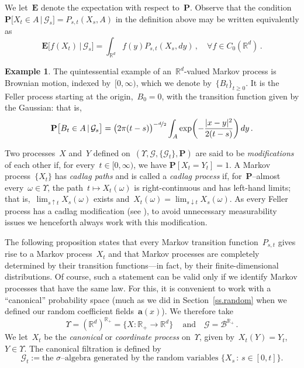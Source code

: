 \documentclass[11pt,twoside]{article} %
\numberwithin{equation}{section}
\theoremstyle{definition}
\newtheorem{example}[theorem]{Example}
\newcommand*{\R}{\ensuremath{\mathbb{R}}}
\newcommand*{\Rd}{\ensuremath{\mathbb{R}^d}}
\renewcommand{\a}{\mathbf{a}}
\begin{document}
We let~$\mathbf{E}$ denote the expectation with respect to~$\mathbf{P}$. Observe that the condition~$\mathbf{P} \bigl[ X_t \in A \, | \, \mathcal{G}_s \bigr] = P_{s,t}(X_s,A)$ in the definition above may be written equivalently as
\begin{equation}
\label{e.Xt.to.Pt}
\mathbf{E} \bigl[ f(X_t) \, |\, \mathcal{G}_s \bigr] 
=
\int_{\Rd} 
f(y) P_{s,t} (X_s,dy) \,, \quad \forall f \in C_0(\Rd)\,.
\end{equation}

\begin{example}
The quintessential example of an~$\Rd$-valued Markov process is Brownian motion, indexed by~$[0,\infty)$, which we denote by~$\{ B_t \}_{t\geq 0}$. It is the Feller process starting at the origin,~$B_0=0$, with the transition function given by the Gaussian: that is, 
\begin{equation}
\label{e.transition.BM}
\mathbf{P}\bigl[ B_t \in A \, | \, \mathcal{G}_s \bigr]
=
\bigl( 2\pi (t-s) \bigr)^{-\nicefrac d2}
\int_A 
\exp \biggl( - \frac{|x-y|^2}{2(t-s)} \biggr)\, dy
\,.
\end{equation}
\end{example}

Two processes~$X$ and~$Y$ defined on~$(\Upsilon, \mathcal{G}, \{ \mathcal{G}_t \},\mathbf{P})$ are said to be \emph{modifications} of each other if, for every~$t \in [0,\infty)$, we have $\mathbf{P}[X_t = Y_t]=1$. A Markov process~$\{ X_t \}$ has \emph{cadlag paths} and is called a \emph{cadlag process} if, for~$\mathbf{P}$--almost every~$\omega \in \Upsilon$, the path~$t \mapsto X_t(\omega)$ is right-continuous and has left-hand limits; that is,~$\lim_{s\uparrow t} X_s(\omega)$ exists and~$X_t(\omega) = \lim_{s\downarrow t} X_s(\omega)$. 
As every Feller process has a cadlag modification (see \cite[Theorem III.2.7]{RY}), to avoid unnecessary measurability issues we henceforth always work with this modification. 

\smallskip

The following proposition states that every Markov transition function~$P_{s,t}$ gives rise to a Markov process~$X_t$ and that Markov processes are completely determined by their transition functions---in fact, by their finite-dimensional distributions. Of course, such a statement can be valid only if we identify Markov processes that have the same law. 
For this, it is convenient to work with a ``canonical'' probability space (much as we did in Section~\ref{ss.random} when we defined our random coefficient fields~$\a(x)$). 
We therefore take 
\begin{equation}
\label{e.Upsilon.canon}
\Upsilon = (\Rd)^{\R_+} = \bigl\{ X : \R_+ \to \Rd \bigr\}\,
\quad \mbox{and} \quad 
\mathcal{G} = \mathscr{B}^{\R_+}\,.
\end{equation}
We let~$X_t$ be the \emph{canonical} or \emph{coordinate process} on~$\Upsilon$,  given by~$X_t(Y) = Y_t$,~$Y \in \Upsilon$. The canonical filtration is defined by
\begin{equation}
\label{e.Gt.canon}
\mathcal{G}_t:= \mbox{the~$\sigma$--algebra generated by the random variables~$\big\{ X_s \,:\, s\in [0,t] \big\}$.}
\end{equation}
\end{document}
